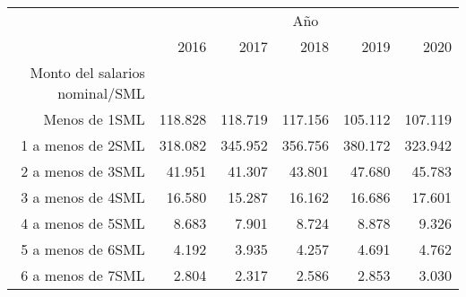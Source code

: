 \begin{tabular}{llllll}
\cline{1-6}
\multicolumn{1}{c}{} &
  \multicolumn{5}{|c}{Año} \\
\multicolumn{1}{c}{} &
  \multicolumn{1}{|r}{2016} &
  \multicolumn{1}{r}{2017} &
  \multicolumn{1}{r}{2018} &
  \multicolumn{1}{r}{2019} &
  \multicolumn{1}{r}{2020} \\
\cline{1-6}
\multicolumn{1}{r}{Monto del salarios nominal/SML} &
  \multicolumn{1}{|r}{} &
  \multicolumn{1}{r}{} &
  \multicolumn{1}{r}{} &
  \multicolumn{1}{r}{} &
  \multicolumn{1}{r}{} \\
\multicolumn{1}{r}{Menos de 1SML\hspace{1em}} &
  \multicolumn{1}{|r}{118.828} &
  \multicolumn{1}{r}{118.719} &
  \multicolumn{1}{r}{117.156} &
  \multicolumn{1}{r}{105.112} &
  \multicolumn{1}{r}{107.119} \\
\multicolumn{1}{r}{1 a menos de 2SML\hspace{1em}} &
  \multicolumn{1}{|r}{318.082} &
  \multicolumn{1}{r}{345.952} &
  \multicolumn{1}{r}{356.756} &
  \multicolumn{1}{r}{380.172} &
  \multicolumn{1}{r}{323.942} \\
\multicolumn{1}{r}{2 a menos de 3SML\hspace{1em}} &
  \multicolumn{1}{|r}{41.951} &
  \multicolumn{1}{r}{41.307} &
  \multicolumn{1}{r}{43.801} &
  \multicolumn{1}{r}{47.680} &
  \multicolumn{1}{r}{45.783} \\
\multicolumn{1}{r}{3 a menos de 4SML\hspace{1em}} &
  \multicolumn{1}{|r}{16.580} &
  \multicolumn{1}{r}{15.287} &
  \multicolumn{1}{r}{16.162} &
  \multicolumn{1}{r}{16.686} &
  \multicolumn{1}{r}{17.601} \\
\multicolumn{1}{r}{4 a menos de 5SML\hspace{1em}} &
  \multicolumn{1}{|r}{8.683} &
  \multicolumn{1}{r}{7.901} &
  \multicolumn{1}{r}{8.724} &
  \multicolumn{1}{r}{8.878} &
  \multicolumn{1}{r}{9.326} \\
\multicolumn{1}{r}{5 a menos de 6SML\hspace{1em}} &
  \multicolumn{1}{|r}{4.192} &
  \multicolumn{1}{r}{3.935} &
  \multicolumn{1}{r}{4.257} &
  \multicolumn{1}{r}{4.691} &
  \multicolumn{1}{r}{4.762} \\
\multicolumn{1}{r}{6 a menos de 7SML\hspace{1em}} &
  \multicolumn{1}{|r}{2.804} &
  \multicolumn{1}{r}{2.317} &
  \multicolumn{1}{r}{2.586} &
  \multicolumn{1}{r}{2.853} &
  \multicolumn{1}{r}{3.030} \\

\end{tabular}
